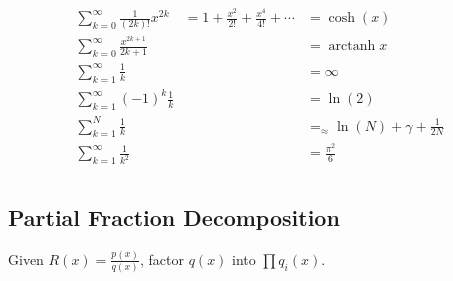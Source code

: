 \begin{itemize}
\begin{align*}
  &\sum_{k=0}^{\infty } \frac{1}{( 2 k ) ! }x ^ { 2 k } \quad = 1 + \frac{x ^ { 2 }}{2 ! } + \frac{x ^ { 4 }}{4 ! } + \cdots                 &=  \cosh(x) & \\
  &\sum_{k=0}^{\infty } \frac{x ^ { 2 k + 1 }}{2 k + 1 }                                                                                     &=  \operatorname { arctanh } x  & \\
  &\sum_{k=1}^\infty \frac{1}{k}                                                                                                             &=  \infty &\\
  &\sum_{k=1}^\infty (-1)^k \frac{1}{k}                                                                                                      &=  \ln (2) & \\
  &\sum_{k=1}^N \frac{1}{k}                                                                                                                  &= _\approx \ln(N) + \gamma + \frac{1}{2N} & \\
  &\sum_{k=1}^{\infty } \frac{1 } {k ^ { 2 } }                                                                                               &=  \frac{\pi ^ { 2 }}{6 }& \\
  \end{align*}
\end{itemize}

\hypertarget{partial-fraction-decomposition}{%
\subsection{Partial Fraction
Decomposition}\label{partial-fraction-decomposition}}

Given \(R(x) = \frac{p(x)}{q(x)}\), factor \(q(x)\) into
\(\prod q_i(x)\).

